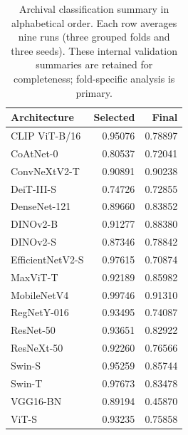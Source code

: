 \begin{table}[t]
\caption{Archival classification summary in alphabetical order. Each row averages nine runs (three grouped folds and three seeds). These internal validation summaries are retained for completeness; fold-specific analysis is primary.}
\label{tab:architectures}
\centering
\small
\setlength{\tabcolsep}{4pt}
\begin{tabular}{lrr}
\toprule
Architecture & Selected & Final \\
\midrule
CLIP ViT-B/16 & 0.95076 & 0.78897 \\
CoAtNet-0 & 0.80537 & 0.72041 \\
ConvNeXtV2-T & 0.90891 & 0.90238 \\
DeiT-III-S & 0.74726 & 0.72855 \\
DenseNet-121 & 0.89660 & 0.83852 \\
DINOv2-B & 0.91277 & 0.88380 \\
DINOv2-S & 0.87346 & 0.78842 \\
EfficientNetV2-S & 0.97615 & 0.70874 \\
MaxViT-T & 0.92189 & 0.85982 \\
MobileNetV4 & 0.99746 & 0.91310 \\
RegNetY-016 & 0.93495 & 0.74087 \\
ResNet-50 & 0.93651 & 0.82922 \\
ResNeXt-50 & 0.92260 & 0.76566 \\
Swin-S & 0.95259 & 0.85744 \\
Swin-T & 0.97673 & 0.83478 \\
VGG16-BN & 0.89194 & 0.45870 \\
ViT-S & 0.93235 & 0.75858 \\
\bottomrule
\end{tabular}
\end{table}
